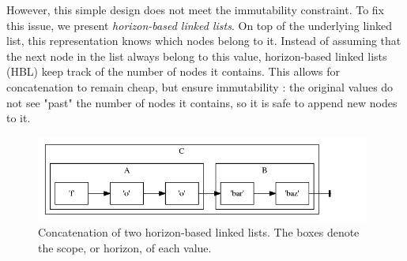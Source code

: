 \documentclass[twoside,11pt,a4paper]{article}
\newcommand{\pls}[1]{\small\texttt{#1}\normalsize}
\newcommand{\plstype}[1]{\pls{#1}}
\newcommand{\varchar}{\plstype{VARCHAR2}}
\begin{document}
However, this simple design does not meet the immutability constraint. To fix this issue, we present \textit{horizon-based linked lists}. On top of the underlying linked list, this representation knows which nodes belong to it. Instead of assuming that the next node in the list always belong to this value, horizon-based linked lists (HBL) keep track of the number of nodes it contains. This allows for concatenation to remain cheap, but ensure immutability : the original values do not see "past" the number of nodes it contains, so it is safe to append new nodes to it.







\begin{figure}[h]
	\centering
	\includegraphics[width=11cm]{./graphs/hblconcat.png}
	\caption[Concatenation of two horizon-based linked lists]{Concatenation of two horizon-based linked lists. The boxes denote the scope, or horizon, of each value.}
	\label{fig:hblconcat}
\end{figure}
\end{document}
